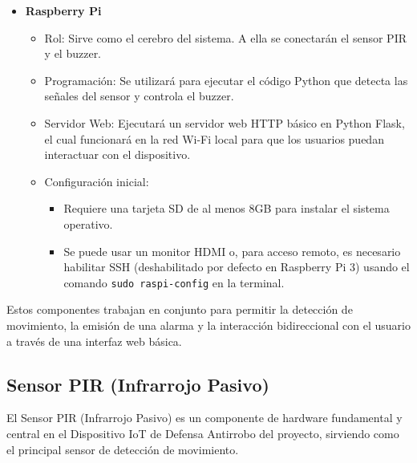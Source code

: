 \documentclass{report}
\begin{document}
\begin{itemize}
    \item \textbf{Raspberry Pi}
    \begin{itemize}
        \item Rol: Sirve como el cerebro del sistema. A ella se conectarán el sensor PIR y el buzzer.
        \item Programación: Se utilizará para ejecutar el código Python que detecta las señales del sensor y controla el buzzer.
        \item Servidor Web: Ejecutará un servidor web HTTP básico en Python Flask, el cual funcionará en la red Wi-Fi local para que los usuarios puedan 
        interactuar con el dispositivo.
        \item Configuración inicial:
        \begin{itemize}
            \item Requiere una tarjeta SD de al menos 8GB para instalar el sistema operativo.
            \item Se puede usar un monitor HDMI o, para acceso remoto, es necesario habilitar SSH (deshabilitado por defecto en Raspberry Pi 3) usando 
            el comando \verb|sudo raspi-config| en la terminal.
        \end{itemize}
    \end{itemize}
\end{itemize}
Estos componentes trabajan en conjunto para permitir la detección de movimiento, la emisión de una alarma y la interacción bidireccional con el 
usuario a través de una interfaz web básica.

\subsection{Sensor PIR (Infrarrojo Pasivo)}
El Sensor PIR (Infrarrojo Pasivo) es un componente de hardware fundamental y central en el Dispositivo IoT de Defensa Antirrobo del proyecto, 
sirviendo como el principal sensor de detección de movimiento.
\end{document}
